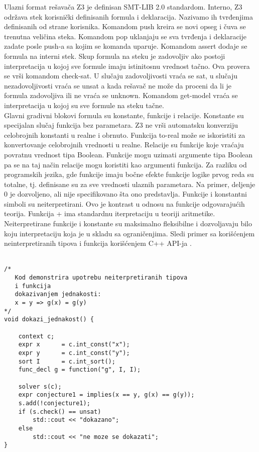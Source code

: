 \documentclass[12pt,oneside]{memoir}
\begin{document}
Ulazni format rešavača Z3 je definisan SMT-LIB 2.0 standardom. Interno, Z3 održava stek korisnički definisanih formula i deklaracija. Nazivamo ih tvrđenjima definisanih od strane korisnika. Komandom push kreira se novi opseg i čuva se trenutna veličina steka. Komandom pop uklanjaju se sva tvrđenja i deklaracije zadate posle push-a sa kojim se komanda uparuje. Komandom assert dodaje se formula na interni stek. Skup formula na steku je zadovoljiv ako postoji interpretacija u kojoj sve formule imaju istinitosnu vrednost tačno. Ova provera se vrši komandom check-sat. U slučaju zadovoljivosti vraća se sat, u slučaju nezadovoljivosti vraća se unsat a kada rešavač ne može da proceni da li je formula zadovoljiva ili ne vraća se unknown. Komandom get-model vraća se interpretacija u kojoj su sve formule na steku tačne. 
\\

Glavni gradivni blokovi formula su konstante, funkcije i relacije. Konstante su specijalan slučaj funkcija bez parametara. Z3 ne vrši automatsku konverziju celobrojnih konstanti u realne i obrnuto. Funkcija to-real može se iskoristiti za konvertovanje celobrojnih vrednosti u realne. Relacije su funkcije koje vraćaju povratnu vrednost tipa Boolean. Funkcije mogu uzimati argumente tipa Boolean pa se na taj način relacije mogu koristiti kao argumenti funkcija. Za razliku od programskih jezika, gde funkcije imaju bočne efekte funkcije logike prvog reda su totalne, tj. definisane su za sve vrednosti ulaznih parametara. Na primer, deljenje 0 je dozvoljeno, ali nije specifikovano šta ono predstavlja. Funkcije i konstantni simboli su neiterpretirani. Ovo je kontrast u odnosu na funkcije odgovarajućih teorija. Funkcija + ima standardnu iterpretaciju u teoriji aritmetike. Neiterpretirane funkcije i konstante su maksimalno fleksibilne i dozvoljavaju bilo koju interpretaciju koja je u skladu sa ograničenjima. 
Sledi primer sa korišćenjem neinterpretiranih tipova i funkcija korišćenjem C++ API-ja . 
\\ \\
\begin{lstlisting}
/*
   Kod demonstrira upotrebu neiterpretiranih tipova
   i funkcija 
   dokazivanjem jednakosti:
   x = y => g(x) = g(y)
*/
void dokazi_jednakost() {
    
    context c;
    expr x      = c.int_const("x");
    expr y      = c.int_const("y");
    sort I      = c.int_sort();
    func_decl g = function("g", I, I);
    
    solver s(c);
    expr conjecture1 = implies(x == y, g(x) == g(y));
    s.add(!conjecture1);
    if (s.check() == unsat) 
        std::cout << "dokazano";
    else
        std::cout << "ne moze se dokazati";
}


\end{lstlisting}
\end{document}

